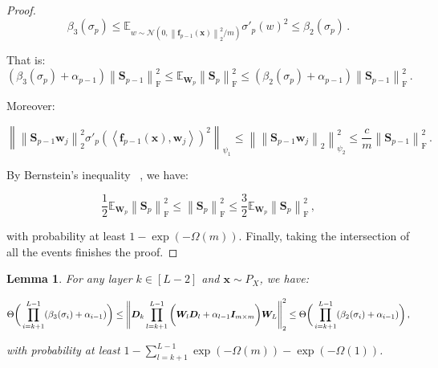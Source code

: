 \documentclass[nohyperref]{article}
\theoremstyle{plain}
\newtheorem{lemma}{Lemma}
\theoremstyle{definition}
\theoremstyle{remark}
\begin{document}
\begin{proof}
\begin{equation*}
    \beta_3(\sigma_p) \leq \mathbb{E}_{w \sim \mathcal N(0, \left \| \bm{f}_{p-1}(\bm{x}) \right \|_2^2/m)}{\sigma'_p}(w)^2 \leq \beta_2(\sigma_p)\,.
\end{equation*}


That is:
\begin{equation*}
    (\beta_3(\sigma_p)+\alpha_{p-1})\left \| \bm{S}_{p-1} \right \| _{\mathrm{F}}^2 \leq\mathbb{E}_{\bm{W}_p} \left \| \bm{S}_p \right \| _{\mathrm{F}}^2 \leq (\beta_2(\sigma_p)+\alpha_{p-1})\left \| \bm{S}_{p-1} \right \| _{\mathrm{F}}^2\,.
\end{equation*}

Moreover:

\begin{equation*}
\left \| \left \| \bm{S}_{p-1}\bm{w}_j \right \| _2^2{\sigma'_p}(\left \langle \bm{f}_{p-1}(\bm{x}),\bm{w}_j \right \rangle )^2 \right \| _{\psi _1} \leq \left \| \left \| \bm{S}_{p-1}\bm{w}_j \right \| _2 \right \| _{\psi _2}^2 \leq \frac{c}{m}\left \| \bm{S}_{p-1} \right \| _{\mathrm{F}}^2\,.
\end{equation*}

By Bernstein’s inequality ~\citep{vershynin12}, we have:

\begin{equation*}
\frac{1}{2} \mathbb{E}_{\bm{W}_p} \left \| \bm{S}_p \right \| _{\mathrm{F}}^2 \leq \left \| \bm{S}_p \right \| _{\mathrm{F}}^2 \leq \frac{3}{2} \mathbb{E}_{\bm{W}_p} \left \| \bm{S}_p \right \| _{\mathrm{F}}^2\,,
\end{equation*}

with probability at least $1-\exp(-\Omega (m))$. 
Finally, taking the intersection of all the events finishes the proof.



\end{proof}

\begin{lemma}
\label{lemma:lemma_C.6_in_ICML_}
For any layer $k \in [L-2]$ and $\bm{x}\sim P_X$, we have:

\begin{equation*}
\small
\Theta \bigg(\prod_{i=k+1}^{L-1}(\beta_3(\sigma_i)+\alpha_{i-1} ) \bigg) \leq \left \| \bm{D}_{k}\prod_{l=k+1}^{L-1}\bigg(\bm{W}_l \bm{D}_{l}+\alpha_{l-1}\bm{I}_{m\times m}\bigg) \bm{W}_L \right \|_2^2 \leq \Theta \bigg(\prod_{i=k+1}^{L-1}(\beta_2(\sigma_i)+\alpha_{i-1} )\bigg) \,,
\end{equation*}

with probability at least $1-\sum_{l=k+1}^{L-1}\exp(-\Omega (m))-\exp(-\Omega (1))$.
\end{lemma}
\end{document}
